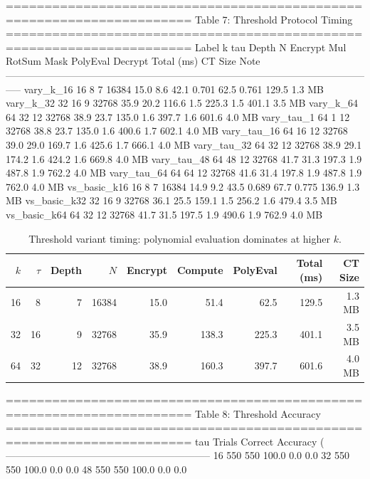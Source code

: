 ======================================================================
  Table 7: Threshold Protocol Timing
======================================================================
         Label   k  tau  Depth      N  Encrypt   Mul  RotSum   Mask  PolyEval  Decrypt  Total (ms)  CT Size  Note
-----------------------------------------------------------------------------------------------------------------
     vary_k_16  16    8      7  16384     15.0   8.6    42.1  0.701      62.5    0.761       129.5   1.3 MB      
     vary_k_32  32   16      9  32768     35.9  20.2   116.6    1.5     225.3      1.5       401.1   3.5 MB      
     vary_k_64  64   32     12  32768     38.9  23.7   135.0    1.6     397.7      1.6       601.6   4.0 MB      
    vary_tau_1  64    1     12  32768     38.8  23.7   135.0    1.6     400.6      1.7       602.1   4.0 MB      
   vary_tau_16  64   16     12  32768     39.0  29.0   169.7    1.6     425.6      1.7       666.1   4.0 MB      
   vary_tau_32  64   32     12  32768     38.9  29.1   174.2    1.6     424.2      1.6       669.8   4.0 MB      
   vary_tau_48  64   48     12  32768     41.7  31.3   197.3    1.9     487.8      1.9       762.2   4.0 MB      
   vary_tau_64  64   64     12  32768     41.6  31.4   197.8    1.9     487.8      1.9       762.0   4.0 MB      
  vs_basic_k16  16    8      7  16384     14.9   9.2    43.5  0.689      67.7    0.775       136.9   1.3 MB      
  vs_basic_k32  32   16      9  32768     36.1  25.5   159.1    1.5     256.2      1.6       479.4   3.5 MB      
  vs_basic_k64  64   32     12  32768     41.7  31.5   197.5    1.9     490.6      1.9       762.9   4.0 MB      

\begin{table}[t]
\centering
\caption{Threshold variant timing: polynomial evaluation dominates at higher $k$.}
\label{tab:threshold-timing}
\begin{tabular}{rrrrrrrrr}
\toprule
$k$ & $\tau$ & Depth & $N$ & Encrypt & Compute & PolyEval & Total (ms) & CT Size \\
\midrule
16 & 8 & 7 & 16384 & 15.0 & 51.4 & 62.5 & 129.5 & 1.3 MB \\
32 & 16 & 9 & 32768 & 35.9 & 138.3 & 225.3 & 401.1 & 3.5 MB \\
64 & 32 & 12 & 32768 & 38.9 & 160.3 & 397.7 & 601.6 & 4.0 MB \\
\bottomrule
\end{tabular}
\end{table}


======================================================================
  Table 8: Threshold Accuracy
======================================================================
  tau  Trials  Correct  Accuracy (%
--------------------------------------------------------------
   16     550      550         100.0          0.0          0.0
   32     550      550         100.0          0.0          0.0
   48     550      550         100.0          0.0          0.0


